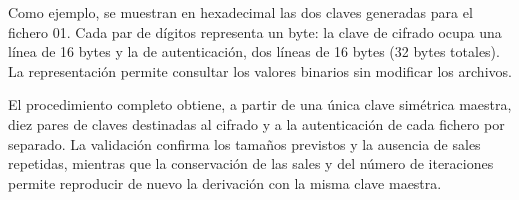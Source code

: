 \begingroup
\renewcommand{\lstlistingname}{Salida y verificación}

\endgroup

Como ejemplo, se muestran en hexadecimal las dos claves generadas para el fichero 01.
Cada par de dígitos representa un byte: la clave de cifrado ocupa una línea de 16 bytes y la de autenticación, dos líneas de 16 bytes (32 bytes totales).
La representación permite consultar los valores binarios sin modificar los archivos.

\begingroup
{}

\endgroup

El procedimiento completo obtiene, a partir de una única clave simétrica maestra, diez pares de claves destinadas al cifrado y a la autenticación de cada fichero por separado.
La validación confirma los tamaños previstos y la ausencia de sales repetidas, mientras que la conservación de las sales y del número de iteraciones permite reproducir de nuevo la derivación con la misma clave maestra.
